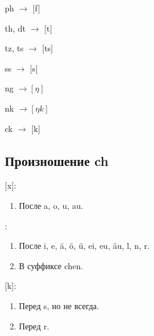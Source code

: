 \documentclass[oneside]{book}
\begin{document}
    ph
    \begin{math}
        \longrightarrow
    \end{math}
    [f]

    th, dt
    \begin{math}
        \longrightarrow
    \end{math}
    [t]

    tz, ts
    \begin{math}
        \longrightarrow
    \end{math}
    [ts]

    ss
    \begin{math}
        \longrightarrow
    \end{math}
    [s]

    ng
    \begin{math}
        \longrightarrow [\eta]
    \end{math}

    nk
    \begin{math}
        \longrightarrow [\eta k]
    \end{math}

    ck
    \begin{math}
        \longrightarrow
    \end{math}
    [k]

    \subsection{Произношение ch}
    [x]:
    \begin{enumerate}
        \item После a, o, u, au.
    \end{enumerate}

    \begin{math}
        [\zeta]
    \end{math}:
    \begin{enumerate}
        \item После i, e, \"a, \"o, \"u, ei, eu, \"au, l, n, r.
        \item В суффиксе chen.
    \end{enumerate}

    [k]:
    \begin{enumerate}
        \item Перед s, но не всегда.
        \item Перед r.
    \end{enumerate}
\end{document}
